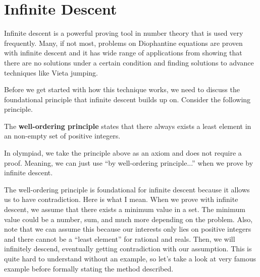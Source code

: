 \documentclass[../../main.tex]{subfiles}
\begin{document}
\section{Infinite Descent}

Infinite descent is a powerful proving tool in number theory that
is used very frequently. Many, if not most, problems on Diophantine
equations are proven with infinite descent and it has wide range
of applications from showing that there are no solutions under
a certain condition and finding solutions to advance techniques
like Vieta jumping.

Before we get started with how this technique works, we need to
discuss the foundational principle that infinite descent builds
up on. Consider the following principle.

\begin{theorem}{}{}
The \textbf{well-ordering principle} states that there always
exists a least element in an non-empty set of positive integers.
\end{theorem}

In olympiad, we take the principle above as an axiom and does not
require a proof. Meaning, we can just use ``by well-ordering
principle...'' when we prove by infinite descent.

The well-ordering principle is foundational for infinite descent
because it allows us to have contradiction. Here is what I mean.
When we prove with infinite descent, we assume that there exists
a minimum value in a set. The minimum value could be a number,
sum, and much more depending on the problem. Also, note that we
can assume this because our interests only lies on positive
integers and there cannot be a ``least element'' for rational
and reals. Then, we will infinitely descend, eventually getting
contradiction with our assumption. This is quite hard to understand
without an example, so let's take a look at very famous example
before formally stating the method described.
\end{document}
